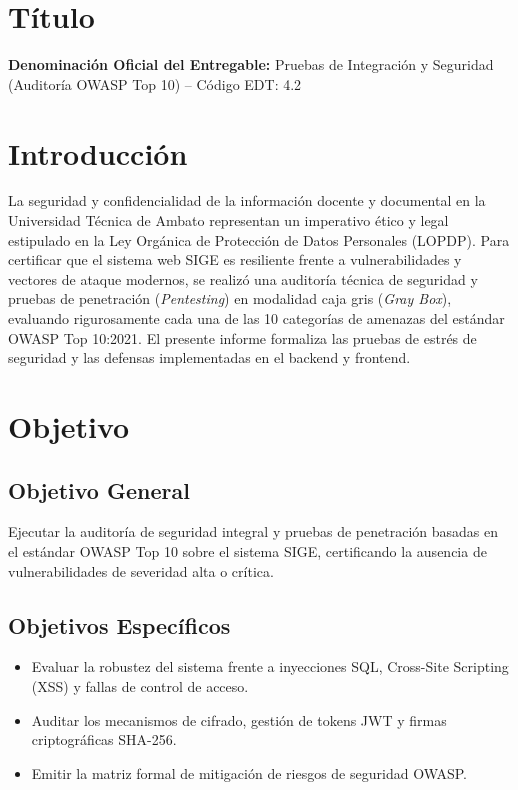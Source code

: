 \documentclass[12pt,a4paper]{article}
\begin{document}

\vspace{0.25cm}

\section{Título}
\textbf{Denominación Oficial del Entregable:} Pruebas de Integración y Seguridad (Auditoría OWASP Top 10) -- Código EDT: 4.2

\section{Introducción}
La seguridad y confidencialidad de la información docente y documental en la Universidad Técnica de Ambato representan un imperativo ético y legal estipulado en la Ley Orgánica de Protección de Datos Personales (LOPDP). Para certificar que el sistema web SIGE es resiliente frente a vulnerabilidades y vectores de ataque modernos, se realizó una auditoría técnica de seguridad y pruebas de penetración (\textit{Pentesting}) en modalidad caja gris (\textit{Gray Box}), evaluando rigurosamente cada una de las 10 categorías de amenazas del estándar OWASP Top 10:2021. El presente informe formaliza las pruebas de estrés de seguridad y las defensas implementadas en el backend y frontend.

\section{Objetivo}
\subsection{Objetivo General}
Ejecutar la auditoría de seguridad integral y pruebas de penetración basadas en el estándar OWASP Top 10 sobre el sistema SIGE, certificando la ausencia de vulnerabilidades de severidad alta o crítica.
\subsection{Objetivos Específicos}
\begin{itemize}[leftmargin=1.5em, itemsep=2pt]
    \item Evaluar la robustez del sistema frente a inyecciones SQL, Cross-Site Scripting (XSS) y fallas de control de acceso.
    \item Auditar los mecanismos de cifrado, gestión de tokens JWT y firmas criptográficas SHA-256.
    \item Emitir la matriz formal de mitigación de riesgos de seguridad OWASP.
\end{itemize}
\end{document}
